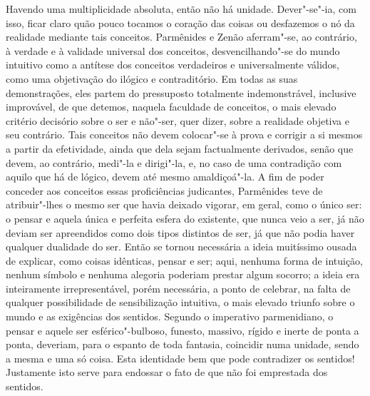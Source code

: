 Havendo uma multiplicidade absoluta, então não há unidade. Dever"-se"-ia,
com isso, ficar claro quão pouco tocamos o coração das coisas ou
desfazemos o nó da realidade mediante tais conceitos. 
Parmênides e Zenão aferram"-se, ao contrário, à verdade e à validade
universal dos conceitos, desvencilhando"-se do mundo intuitivo como a
antítese dos conceitos verdadeiros e universalmente válidos, como uma
objetivação do ilógico e contraditório. Em todas as suas demonstrações,
eles partem do pressuposto totalmente indemonstrável, inclusive
improvável, de que detemos, naquela faculdade de conceitos, o mais
elevado critério decisório sobre o ser e não"-ser, quer dizer, sobre a
realidade objetiva e seu contrário. Tais conceitos não devem colocar"-se
à prova e corrigir a si mesmos a partir da efetividade, ainda que dela
sejam factualmente derivados, senão que devem, ao contrário, medi"-la e
dirigi"-la, e, no caso de uma contradição com aquilo que há de lógico,
devem até mesmo amaldiçoá"-la. A fim de poder conceder aos conceitos
essas proficiências judicantes, Parmênides teve de atribuir"-lhes o
mesmo ser que havia deixado vigorar, em geral, como o único ser: o
pensar e aquela única e perfeita esfera do existente, que nunca veio a
ser, já não deviam ser apreendidos como dois tipos distintos de ser, já
que não podia haver qualquer dualidade do ser. Então se tornou
necessária a ideia muitíssimo ousada de explicar, como coisas
idênticas, pensar e ser; aqui, nenhuma forma de intuição, nenhum
símbolo e nenhuma alegoria poderiam prestar algum socorro; a ideia era
inteiramente irrepresentável, porém necessária, a ponto de celebrar, na
falta de qualquer possibilidade de sensibilização intuitiva, o mais
elevado triunfo sobre o mundo e as exigências dos sentidos. Segundo o
imperativo parmenidiano, o pensar e aquele ser esférico"-bulboso,
funesto, massivo, rígido e inerte de ponta a ponta, deveriam, para o
espanto de toda fantasia, coincidir numa unidade, sendo a mesma e uma
só coisa. Esta identidade bem que pode contradizer os sentidos!
Justamente isto serve para endossar o fato de que não foi emprestada
dos sentidos. 

\sectionitem


